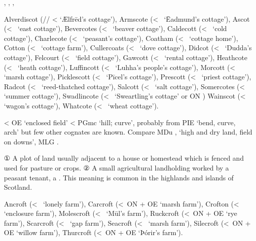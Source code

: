 \documentclass[12pt,letterpaper,oneside,article,draft]{memoir}
\begin{document}
\begin{Lemma}
\begin{Also}
	, , , 
\end{Also}
\begin{Examples}
	Alverdiscot (// <  ‘Ælfrēd’s cottage’),
	Armscote (<~ ‘Ēadmund’s cottage’),
	Ascot (<~ ‘east cottage’),
	Bevercotes (<~ ‘beaver cottage’),
	Caldecott (<~ ‘cold cottage’),
	Charlecote (<~ ‘peasant’s cottage’),
	Coatham (<~ ‘cottage home’),
	Cotton (<~ ‘cottage farm’),
	Cullercoats (<~ ‘dove cottage’),
	Didcot (<~ ‘Dudda’s cottage’),
	Felcourt (<~ ‘field cottage’),
	Gawcott (<~ ‘rental cottage’),
	Heathcote (<~ ‘heath cottage’),
	Luffincott (<~ ‘Luhha’s people’s cottage’),
	Morcott (<~ ‘marsh cottage’),
	Picklescott (<~ ‘Pīcel’s cottage’),
	Prescott (<~ ‘priest cottage’),
	Radcot (<~ ‘reed-thatched cottage’),
	Salcott (<~ ‘salt cottage’),
	Somercotes (<~ ‘summer cottage’),
	Swadlincote (<~ ‘Sweartling’s cottage’ or ON )
	Wainscot (<~ ‘wagon’s cottage’),
	Whatcote (<~ ‘wheat cottage’).
\end{Examples}
\end{Lemma}

\begin{Lemma}
\begin{Etymology}
	< OE  ‘enclosed field’ < PGmc  ‘hill; curve’, probably from
		PIE  ‘bend, curve, arch’ but few other cognates are known.
	Compare
	MDu ,  ‘high and dry land, field on downs’, MLG .
\end{Etymology}
\begin{Definitions}
	① A plot of land usually adjacent to a house or homestead which is fenced and used for pasture or crops.
	② A small agricultural landholding worked by a peasant tenant, a . This meaning is common
		in the highlands and islands of Scotland.
\end{Definitions}
\begin{Examples}
	Ancroft (<~ ‘lonely farm’), Carcroft (<~ON  + OE  ‘marsh farm’), Crofton (<~ ‘enclosure farm’), Molescroft (<~ ‘Mūl’s farm’), Ruckcroft (<~ON  + OE  ‘rye farm’), Scarcroft (<~ ‘gap farm’), Seacroft (<~ ‘marsh farm’), Silecroft (<~ON  + OE  ‘willow farm’), Thurcroft (<~ON  + OE  ‘Þórir’s farm’).
\end{Examples}
\end{Lemma}
\end{document}
